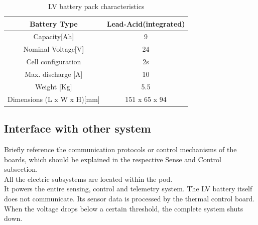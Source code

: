 \begin{table}[h]
    \centering
    \begin{adjustbox}{width=\textwidth,center}
    \begin{tabular}{|c|c|}
       \hline
       Battery Type & Lead-Acid(integrated)\\
       \hline
       Capacity[Ah] & 9 \\
       \hline
       Nominal Voltage[V] & 24 \\
       \hline
       Cell configuration & 2s \\
       \hline
       Max. discharge [A] & 10 \\
       \hline
       Weight [Kg] & 5.5 \\
       \hline 
       Dimensions (L x W x H)[mm] & 151 x 65 x 94 \\
       \hline 
    \end{tabular}
    \end{adjustbox}
    \label{Low Voltage Battery Specs}
    \caption{LV battery pack characteristics}
\end{table}    

\subsection{Interface with other system}
Briefly reference the communication protocols or control mechanisms of the boards, which should be explained in the respective Sense and Control subsection. \\
All the electric subsystems are located within the pod. \\
It powers the entire sensing, control and telemetry system. 
The LV battery itself does not communicate. Its sensor data is processed by the thermal control board.
When the voltage drops below a certain threshold, the complete system shuts down.

